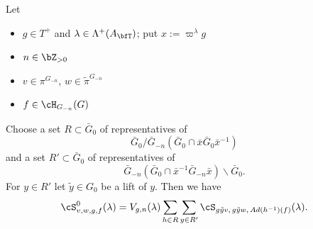 \documentclass[12pt,a4paper]{amsart}%
\begin{document}
\begin{lemma}\label{lem:S0.decomp}
Let
\begin{itemize}
    \item $g\in T^+$ and $\lambda\in\Lambda^+(A_\bfT)$; put $x:=\varpi^\lambda g$
    \item $n\in \Z_{>0}$
    \item $v\in \pi^{G_{-n}}$, $w\in \tilde\pi^{G_{-n}}$
    \item $f\in \cH_{G_{-n}}(G)$
\end{itemize}
Choose a set $R\subset \bar G_0$ of representatives of $$\bar G_0/\bar G_{-n}(\bar G_0 \cap  \bar x \bar G_0 \bar x^{-1})$$ and a set $R'\subset \bar G_0$ of representatives of $$\bar G_{-n}(\bar G_0 \cap  \bar x^{-1} \bar G_{-n} \bar x)\backslash \bar G_0 .$$
For $y\in R'$ let $\tilde y\in G_0$ be a lift of $y$. Then we have
$$\cS^0_{v,w,g,f}(\lambda)=V_{g,n}(\lambda)\sum_{h\in R}\sum_{y\in R'} \cS_{g\tilde yv,\,g\tilde yw,\,Ad(h^{-1})(f)}(\lambda).$$
\end{lemma}
\end{document}

